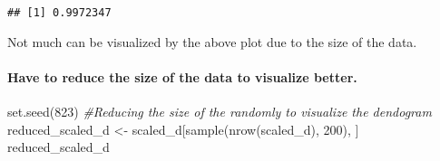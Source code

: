 \documentclass[
]{article}
\newenvironment{Shaded}{\begin{snugshade}}{\end{snugshade}}
\newcommand{\CommentTok}[1]{\textcolor[rgb]{0.56,0.35,0.01}{\textit{#1}}}
\newcommand{\DecValTok}[1]{\textcolor[rgb]{0.00,0.00,0.81}{#1}}
\newcommand{\FunctionTok}[1]{\textcolor[rgb]{0.00,0.00,0.00}{#1}}
\newcommand{\NormalTok}[1]{#1}
\newcommand{\OtherTok}[1]{\textcolor[rgb]{0.56,0.35,0.01}{#1}}
\begin{document}
\begin{verbatim}
## [1] 0.9972347
\end{verbatim}

Not much can be visualized by the above plot due to the size of the
data.

\hypertarget{have-to-reduce-the-size-of-the-data-to-visualize-better.}{%
\paragraph{Have to reduce the size of the data to visualize
better.}\label{have-to-reduce-the-size-of-the-data-to-visualize-better.}}

\begin{Shaded}
\begin{Highlighting}[]
\FunctionTok{set.seed}\NormalTok{(}\DecValTok{823}\NormalTok{)}
\CommentTok{\#Reducing the size of the randomly to visualize the dendogram}
\NormalTok{reduced\_scaled\_d }\OtherTok{\textless{}{-}}\NormalTok{ scaled\_d[}\FunctionTok{sample}\NormalTok{(}\FunctionTok{nrow}\NormalTok{(scaled\_d), }\DecValTok{200}\NormalTok{), ]}
\NormalTok{reduced\_scaled\_d}
\end{Highlighting}
\end{Shaded}
\end{document}

